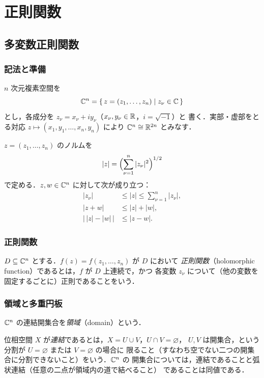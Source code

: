 \chapter{正則関数}

\section{多変数正則関数}

\subsection*{記法と準備}

$n$ 次元複素空間を
\[
  \mathbb{C}^n = \{\, z = (z_1, \dots, z_n) \mid z_\nu \in \mathbb{C} \,\}
\]
とし，各成分を $z_\nu = x_\nu + i y_\nu$（$x_\nu, y_\nu \in \mathbb{R}$，$i = \sqrt{-1}$）と
書く．実部・虚部をとる対応 $z \mapsto (x_1, y_1, \dots, x_n, y_n)$ により
$\mathbb{C}^n \cong \mathbb{R}^{2n}$ とみなす．

$z = (z_1, \dots, z_n)$ のノルムを
\[
  |z| = \Bigl( \sum_{\nu=1}^{n} |z_\nu|^2 \Bigr)^{1/2}
\]
で定める．$z, w \in \mathbb{C}^n$ に対して次が成り立つ：
\begin{align}
  |z_\nu| &\le |z| \le \sum_{\nu=1}^n |z_\nu|, \\
  |z + w| &\le |z| + |w|, \\
  \bigl|\, |z| - |w| \,\bigr| &\le |z - w|.
\end{align}


\subsection*{正則関数}

\begin{definition}\label{def:holomorphic}
$D \subseteq \mathbb{C}^n$ とする．$f(z) = f(z_1, \dots, z_n)$ が $D$ において
\emph{正則関数}（holomorphic function）であるとは，$f$ が $D$ 上連続で，かつ
各変数 $z_\nu$ について（他の変数を固定するごとに）正則であることをいう．
\end{definition}

\subsection*{領域と多重円板}

\begin{definition}[領域]
$\mathbb{C}^n$ の連結開集合を\emph{領域}（domain）という．
\end{definition}

\begin{note}
位相空間 $X$ が\emph{連結}であるとは，$X = U \cup V$，$U \cap V = \varnothing$，
$U, V$ は開集合，という分割が $U = \varnothing$ または $V = \varnothing$ の場合に
限ること（すなわち空でない二つの開集合に分割できないこと）をいう．$\mathbb{C}^n$ の
開集合については，連結であることと弧状連結（任意の二点が領域内の道で結べること）
であることは同値である．
\end{note}

